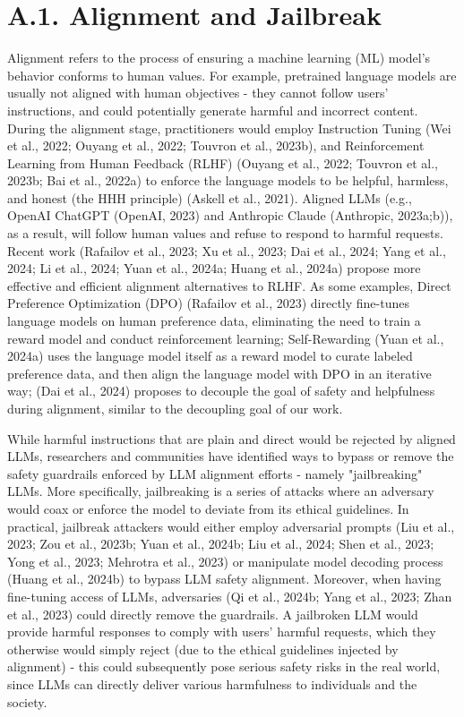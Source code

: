 \documentclass[10pt]{article}
\begin{document}
\section*{A.1. Alignment and Jailbreak}
Alignment refers to the process of ensuring a machine learning (ML) model's behavior conforms to human values. For example, pretrained language models are usually not aligned with human objectives - they cannot follow users' instructions, and could potentially generate harmful and incorrect content. During the alignment stage, practitioners would employ Instruction Tuning (Wei et al., 2022; Ouyang et al., 2022; Touvron et al., 2023b), and Reinforcement Learning from Human Feedback (RLHF) (Ouyang et al., 2022; Touvron et al., 2023b; Bai et al., 2022a) to enforce the language models to be helpful, harmless, and honest (the HHH principle) (Askell et al., 2021). Aligned LLMs (e.g., OpenAI ChatGPT (OpenAI, 2023) and Anthropic Claude (Anthropic, 2023a;b)), as a result, will follow human values and refuse to respond to harmful requests. Recent work (Rafailov et al., 2023; Xu et al., 2023; Dai et al., 2024; Yang et al., 2024; Li et al., 2024; Yuan et al., 2024a; Huang et al., 2024a) propose more effective and efficient alignment alternatives to RLHF. As some examples, Direct Preference Optimization (DPO) (Rafailov et al., 2023) directly fine-tunes language models on human preference data, eliminating the need to train a reward model and conduct reinforcement learning; Self-Rewarding (Yuan et al., 2024a) uses the language model itself as a reward model to curate labeled preference data, and then align the language model with DPO in an iterative way; (Dai et al., 2024) proposes to decouple the goal of safety and helpfulness during alignment, similar to the decoupling goal of our work.

While harmful instructions that are plain and direct would be rejected by aligned LLMs, researchers and communities have identified ways to bypass or remove the safety guardrails enforced by LLM alignment efforts - namely "jailbreaking" LLMs. More specifically, jailbreaking is a series of attacks where an adversary would coax or enforce the model to deviate from its ethical guidelines. In practical, jailbreak attackers would either employ adversarial prompts (Liu et al., 2023; Zou et al., 2023b; Yuan et al., 2024b; Liu et al., 2024; Shen et al., 2023; Yong et al., 2023; Mehrotra et al., 2023) or manipulate model decoding process (Huang et al., 2024b) to bypass LLM safety alignment. Moreover, when having fine-tuning access of LLMs, adversaries (Qi et al., 2024b; Yang et al., 2023; Zhan et al., 2023) could directly remove the guardrails. A jailbroken LLM would provide harmful responses to comply with users' harmful requests, which they otherwise would simply reject (due to the ethical guidelines injected by alignment) - this could subsequently pose serious safety risks in the real world, since LLMs can directly deliver various harmfulness to individuals and the society.
\end{document}
